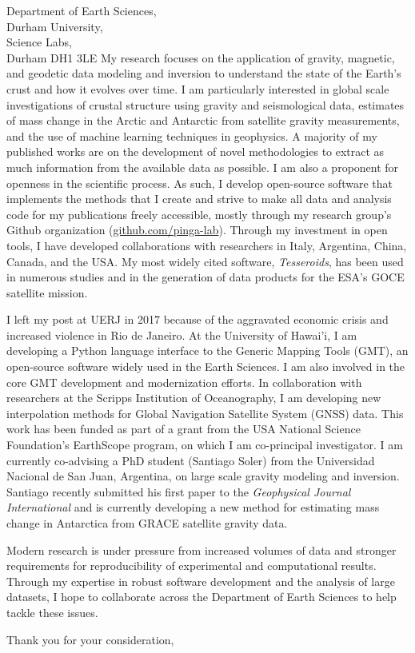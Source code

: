 \documentclass[11pt]{letter}
\begin{document}
\begin{letter}{
        Department of Earth Sciences,  \\
        Durham University, \\
        Science Labs, \\
        Durham DH1 3LE
}
My research focuses on the application of gravity, magnetic, and geodetic data modeling
and inversion to understand the state of the Earth's crust and how it evolves over time.
I am particularly interested in global scale investigations of crustal structure using
gravity and seismological data,
estimates of mass change in the Arctic and Antarctic from satellite gravity measurements,
and the use of machine learning techniques in geophysics.
A majority of my published works are on the development of novel methodologies to
extract as much information from the available data as possible.
I am also a proponent for openness in the scientific process.
As such, I develop open-source software that implements the methods that I create and
strive to make all data and analysis code for my publications freely accessible,
mostly through my research group's Github organization
(\href{https://github.com/pinga-lab}{github.com/pinga-lab}).
Through my investment in open tools, I have developed collaborations with
researchers in Italy, Argentina, China, Canada, and the USA.
My most widely cited software, \textit{Tesseroids}, has been used in numerous studies and
in the generation of data products for the ESA's GOCE satellite mission.

I left my post at UERJ in 2017 because of the aggravated economic crisis and increased
violence in Rio de Janeiro.
At the University of Hawai'i, I am developing a Python language interface to the Generic
Mapping Tools (GMT), an open-source software widely used in the Earth Sciences.
I am also involved in the core GMT development and modernization efforts.
In collaboration with researchers at the Scripps Institution of Oceanography, I am
developing new interpolation methods for Global Navigation Satellite System (GNSS) data.
This work has been funded as part of a grant from the USA National Science Foundation's
EarthScope program, on which I am co-principal investigator.
I am currently
co-advising a PhD student (Santiago Soler) from the Universidad Nacional de San Juan,
Argentina, on large scale gravity modeling and inversion.
Santiago recently submitted his first paper to the \textit{Geophysical Journal
International} and is currently developing a new method for estimating mass change in
Antarctica from GRACE satellite gravity data.

Modern research is under pressure from increased volumes of data and stronger
requirements for reproducibility of experimental and computational results.
Through my expertise in robust software development and the analysis of large datasets,
I hope to collaborate across the Department of Earth Sciences to help tackle these
issues.


\closing{Thank you for your consideration,}


\end{letter}
\end{document}
